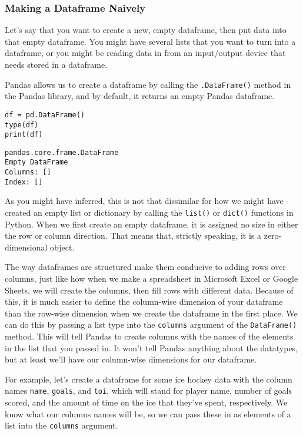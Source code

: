 \subsubsection{Making a Dataframe Naively}
Let's say that you want to create a new, empty dataframe, then put data into that empty dataframe. You might have several lists that you want to turn into a dataframe, or you might be reading data in from an input/output device that needs stored in a dataframe.\par
Pandas allows us to create a dataframe by calling the \verb|.DataFrame()| method in the Pandas library, and by default, it returns an empty Pandas dataframe.
\begin{lstlisting}[style=pippython]
df = pd.DataFrame()
type(df)
print(df)
\end{lstlisting}
\begin{lstlisting}[style=none]
pandas.core.frame.DataFrame
Empty DataFrame
Columns: []
Index: []
\end{lstlisting}
As you might have inferred, this is not that dissimilar for how we might have created an empty list or dictionary by calling the \verb|list()| or \verb|dict()| functions in Python. When we first create an empty dataframe, it is assigned no size in either the row or column direction. That means that, strictly speaking, it is a zero-dimensional object.\par
The way dataframes are structured make them conducive to adding rows over columns, just like how when we make a spreadsheet in Microsoft Excel or Google Sheets, we will create the columns, then fill rows with different data. Because of this, it is much easier to define the column-wise dimension of your dataframe than the row-wise dimension when we create the dataframe in the first place. We can do this by passing a list type into the \verb|columns| argument of the \verb|DataFrame()| method. This will tell Pandas to create columns with the names of the elements in the list that you passed in. It won't tell Pandas anything about the datatypes, but at least we'll have our column-wise dimensions for our dataframe.\par
For example, let's create a dataframe for some ice hockey data with the column names \verb|name|, \verb|goals|, and \verb|toi|, which will stand for player name, number of goals scored, and the amount of time on the ice that they've spent, respectively. We know what our columns names will be, so we can pass these in as elements of a list into the \verb|columns| argument.\par
